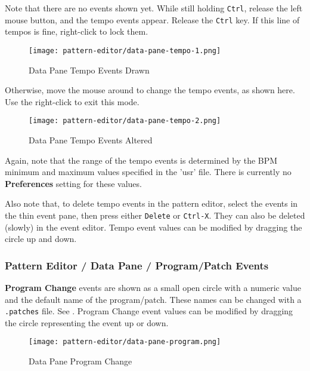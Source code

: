    Note that there are no events shown yet.
   While still holding \texttt{Ctrl}, release the left mouse button,
   and the tempo events appear.
   Release the \texttt{Ctrl} key.
   If this line of tempos is fine, right-click to lock them.

\begin{figure}[H]
   \centering 
   \texttt{[image: pattern-editor/data-pane-tempo-1.png]}
   \caption{Data Pane Tempo Events Drawn}
   \label{fig:pattern_editor_data_pane_tempo_events_drawn}
\end{figure}

   Otherwise, move the mouse around to change
   the tempo events, as shown here.
   Use the right-click to exit this mode.

\begin{figure}[H]
   \centering 
   \texttt{[image: pattern-editor/data-pane-tempo-2.png]}
   \caption{Data Pane Tempo Events Altered}
   \label{fig:pattern_editor_data_pane_tempo_events_altered}
\end{figure}

   Again, note that the range of the tempo events is
   determined by the BPM minimum and maximum values
   specified in the 'usr' file.
   There is currently no \textbf{Preferences}
   setting for these values.  

   Also note that, to delete tempo events in the pattern editor,
   select the events in the thin event pane, then press
   either \texttt{Delete} or \texttt{Ctrl-X}.
   They can also be deleted (slowly) in the event editor.
   Tempo event values can be modified by dragging the circle up and
   down.

\subsubsection{Pattern Editor / Data Pane / Program/Patch Events}
\label{subsubsec:pattern_editor_data_view_program_patch_events}

   \textbf{Program Change}
   events are shown as a small open circle with a numeric value and
   the default name of the program/patch.
   These names can be changed with a \texttt{.patches} file.
   See .
   Program Change event values can be modified by dragging
   the circle representing the event up or down.

\begin{figure}[H]
   \centering 
   \texttt{[image: pattern-editor/data-pane-program.png]}
   \caption{Data Pane Program Change}
   \label{fig:pattern_editor_data_pane_program_change}
\end{figure}

